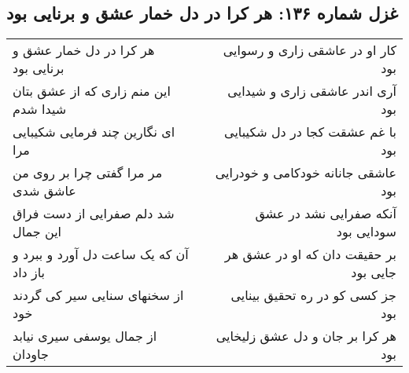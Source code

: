 \begin{center}
\section*{غزل شماره ۱۳۶: هر کرا در دل خمار عشق و برنایی بود}
\label{sec:136}
\begin{longtable}{l p{0.5cm} r}
هر کرا در دل خمار عشق و برنایی بود
&&
کار او در عاشقی زاری و رسوایی بود
\\
این منم زاری که از عشق بتان شیدا شدم
&&
آری اندر عاشقی زاری و شیدایی بود
\\
ای نگارین چند فرمایی شکیبایی مرا
&&
با غم عشقت کجا در دل شکیبایی بود
\\
مر مرا گفتی چرا بر روی من عاشق شدی
&&
عاشقی جانانه خودکامی و خودرایی بود
\\
شد دلم صفرایی از دست فراق این جمال
&&
آنکه صفرایی نشد در عشق سودایی بود
\\
آن که یک ساعت دل آورد و ببرد و باز داد
&&
بر حقیقت دان که او در عشق هر جایی بود
\\
از سخنهای سنایی سیر کی گردند خود
&&
جز کسی کو در ره تحقیق بینایی بود
\\
از جمال یوسفی سیری نیابد جاودان
&&
هر کرا بر جان و دل عشق زلیخایی بود
\\
\end{longtable}
\end{center}
